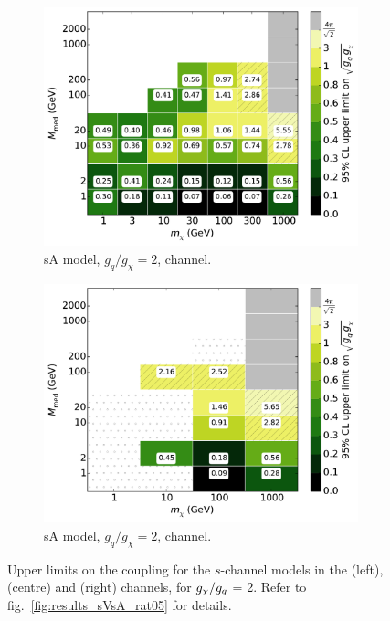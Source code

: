 \begin{figure}
\begin{subfigure}[t]{0.32\textwidth}
    \includegraphics[width=1.\textwidth]{figures/grid_allpoints_SAD_rat2.pdf}
    \caption{sA model, $g_q/g_{\chi} = 2$, \monoZ channel.}
  \end{subfigure}
  \begin{subfigure}[t]{0.32\textwidth}
    \centering
    \includegraphics[width=1.\textwidth]{figures/grid_basepoints_SAD_rat2_monoWZ.pdf}
    \caption{sA model, $g_q/g_{\chi} = 2$, \monoWZ channel.}
  \end{subfigure}
  \caption{Upper limits on the coupling for the $s$-channel models in the \monojet (left), \monoZ (centre) and \monoWZ (right) channels, for $g_{\chi} / g_q$ = 2. Refer to fig.~\ref{fig:results_sVsA_rat05} for details.}
  \label{fig:results_sVsA_rat2}
\end{figure}

